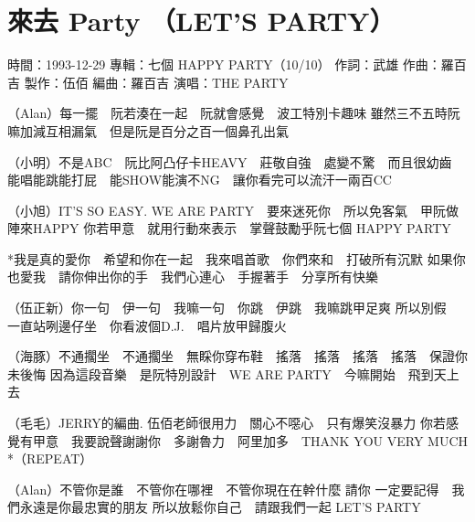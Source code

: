 \documentclass[UTF8,a4paper,oneside,twocolumn,12pt]{ctexbook}
\newcommand{\infopair}[2]{\textbullet #1：#2}
\newcommand{\zc}[1][伍佰]{\infopair{作詞}{#1}}
\newcommand{\zq}[1][伍佰]{\infopair{作曲}{#1}}
\newcommand{\bq}[1][伍佰]{\infopair{編曲}{#1}}
\newcommand{\zj}[1]{\infopair{專輯}{#1}}
\newcommand{\zz}[1]{\infopair{製作}{#1}}
\newcommand{\sj}[1]{\infopair{時間}{#1}}
\newenvironment{info}{\begin{flushleft}\kaishu
	}
	{\end{flushleft}\normalsize\yahei\par}
\newenvironment{lyric}{
	}
{}
\begin{document}
\section{來去 Party （LET'S PARTY）}
\begin{info}
	\sj{1993-12-29}
	\zj{七個 HAPPY PARTY（10/10）}
	\zc[武雄]
	\zq[羅百吉]
	\zz{伍佰}
	\bq[羅百吉]
	\infopair{演唱}{THE PARTY}
\end{info}
\begin{lyric}
	（Alan）每一擺　阮若湊在一起　阮就會感覺　波工特別卡趣味
	雖然三不五時阮嘛加減互相漏氣　但是阮是百分之百一個鼻孔出氣

	（小明）不是ABC　阮比阿凸仔卡HEAVY　莊敬自強　處變不驚　而且很幼齒
	能唱能跳能打屁　能SHOW能演不NG　讓你看完可以流汗一兩百CC

	（小旭）IT'S SO EASY. WE ARE PARTY　要來迷死你　所以免客氣　甲阮做陣來HAPPY
	你若甲意　就用行動來表示　掌聲鼓勵乎阮七個 HAPPY PARTY

	*我是真的愛你　希望和你在一起　我來唱首歌　你們來和　打破所有沉默
	如果你也愛我　請你伸出你的手　我們心連心　手握著手　分享所有快樂

	（伍正新）你一句　伊一句　我嘛一句　你跳　伊跳　我嘛跳甲足爽
	所以別假　一直站咧邊仔坐　你看波個D.J.　唱片放甲歸腹火

	（海豚）不通擱坐　不通擱坐　無睬你穿布鞋　搖落　搖落　搖落　搖落　保證你未後悔
	因為這段音樂　是阮特別設計　WE ARE PARTY　今嘛開始　飛到天上去

	（毛毛）JERRY的編曲. 伍佰老師很用力　關心不噁心　只有爆笑沒暴力
	你若感覺有甲意　我要說聲謝謝你　多謝魯力　阿里加多　THANK YOU VERY MUCH
	*（REPEAT）

	（Alan）不管你是誰　不管你在哪裡　不管你現在在幹什麼
	請你 一定要記得　我們永遠是你最忠實的朋友
	所以放鬆你自己　請跟我們一起
	LET'S PARTY
\end{lyric}
\end{document}
